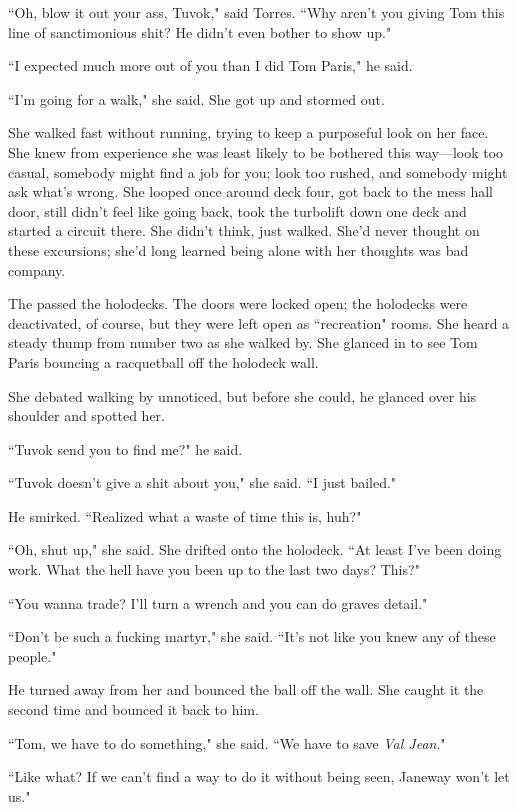 \documentclass[twoside,letterpaper,12pt]{memoir}
\begin{document}
``Oh, blow it out your ass, Tuvok," said Torres. ``Why aren't you giving Tom this line of sanctimonious shit? He didn't even bother to show up." 

``I expected much more out of you than I did Tom Paris," he said. 

``I'm going for a walk," she said. She got up and stormed out. 

She walked fast without running, trying to keep a purposeful look on her face. She knew from experience she was least likely to be bothered this way---look too casual, somebody might find a job for you; look too rushed, and somebody might ask what's wrong. She looped once around deck four, got back to the mess hall door, still didn't feel like going back, took the turbolift down one deck and started a circuit there. She didn't think, just walked. She'd never thought on these excursions; she'd long learned being alone with her thoughts was bad company. 

The passed the holodecks. The doors were locked open; the holodecks were deactivated, of course, but they were left open as ``recreation" rooms. She heard a steady thump from number two as she walked by. She glanced in to see Tom Paris bouncing a racquetball off the holodeck wall. 

She debated walking by unnoticed, but before she could, he glanced over his shoulder and spotted her. 

``Tuvok send you to find me?" he said. 

``Tuvok doesn't give a shit about you," she said. ``I just bailed." 

He smirked. ``Realized what a waste of time this is, huh?" 

``Oh, shut up," she said. She drifted onto the holodeck. ``At least I've been doing work. What the hell have you been up to the last two days? This?" 

``You wanna trade? I'll turn a wrench and you can do graves detail." 

``Don't be such a fucking martyr," she said. ``It's not like you knew any of these people." 

He turned away from her and bounced the ball off the wall. She caught it the second time and bounced it back to him. 

``Tom, we have to do something," she said. ``We have to save \textit{Val Jean}." 

``Like what? If we can't find a way to do it without being seen, Janeway won't let us." 
\end{document}
